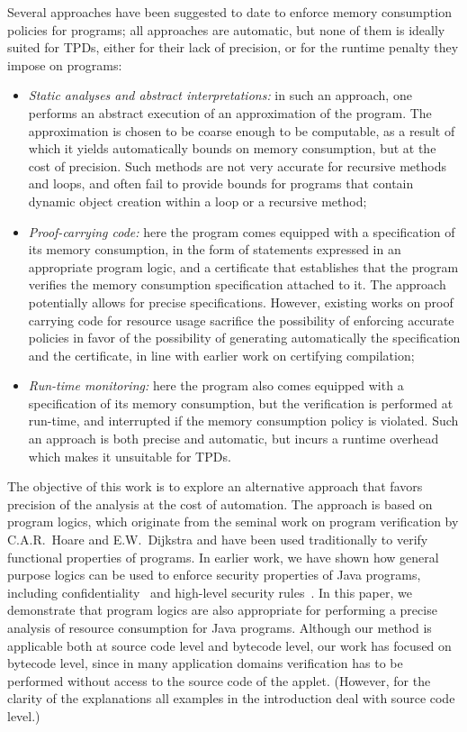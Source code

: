 Several approaches have been suggested to date to enforce memory
consumption policies for programs; all approaches are automatic,
but none of them is ideally suited for TPDs, either for their
lack of precision, or for the runtime penalty they impose on
programs:
\begin{itemize}
\item \emph{Static analyses and abstract interpretations:} in such an
approach, one performs an abstract execution of an approximation of
the program. The approximation is chosen to be coarse enough to be
computable, as a result of which it yields automatically bounds on
memory consumption, but at the cost of precision. Such methods are not
very accurate for recursive methods and loops, and often fail to
provide bounds for programs that contain dynamic object creation
within a loop or a recursive method;


\item \emph{Proof-carrying code:} here the program
comes equipped with a specification of its memory consumption, in the
form of statements expressed in an appropriate program logic, and a
certificate that establishes that the program verifies the memory
consumption specification attached to it. The approach potentially
allows for precise specifications. However, existing works on proof
carrying code for resource usage sacrifice the possibility of
enforcing accurate policies in favor of the possibility of generating
automatically the specification and the certificate, in line with
earlier work on certifying compilation;

\item \emph{Run-time monitoring:}  here the program
also comes equipped with a specification of its memory consumption, 
but the verification is performed at run-time, and interrupted if
the memory consumption policy is violated. Such an approach is both
 precise and automatic, but incurs a runtime overhead which 
makes it unsuitable for TPDs.
\end{itemize}
The objective of this work is to explore an alternative approach that
favors precision of the analysis at the cost of automation. The
approach is based on program logics, which originate from the seminal
work on program verification by C.A.R.~Hoare and E.W.~Dijkstra and
have been used traditionally to verify functional properties of
programs. In earlier work, we have shown how general purpose logics
can be used to enforce security properties of Java programs, including
confidentiality~\cite{gpt04:csfw} and high-level security
rules~\cite{m+04:cardis}. In this paper, we demonstrate that program
logics are also appropriate for performing a precise analysis of
resource consumption for Java programs.  Although our method is
applicable both at source code level and bytecode level, our work 
has focused on bytecode level, since in many application domains
verification has to be performed without access to the source code
of the applet. (However,  for the clarity of the explanations all
examples in the introduction deal with source code level.)

